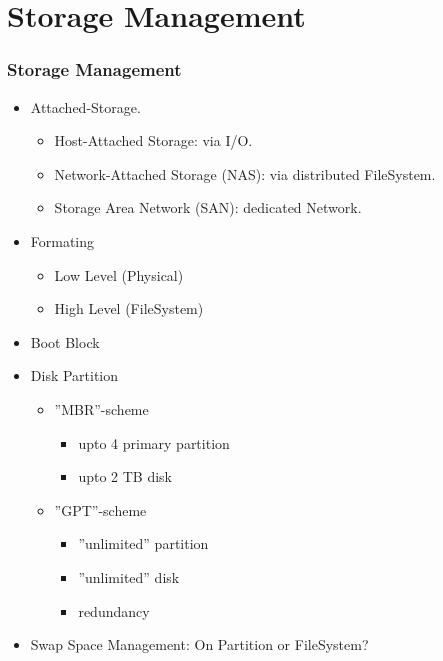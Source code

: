 \documentclass[xcolor=table, notheorems, hyperref={pdfpagelabels=false}]{beamer}
\begin{document}
\section{Storage Management}
\begin{frame}
\frametitle{Storage Management}
\begin{itemize}
\item Attached-Storage.
\begin{itemize}
\item Host-Attached Storage: via I/O.
\item Network-Attached Storage (NAS): via distributed FileSystem.
\item Storage Area Network (SAN): dedicated Network.
\end{itemize}
\item Formating
\begin{itemize}
\item Low Level (Physical)
\item High Level (FileSystem)
\end{itemize}
\item Boot Block
\item Disk Partition
\begin{itemize}
\item ''MBR''-scheme
\begin{itemize}
\item upto 4 primary partition
\item upto 2 TB disk
\end{itemize}
\item ''GPT''-scheme
\begin{itemize}
\item ''unlimited'' partition
\item ''unlimited'' disk
\item redundancy
\end{itemize}
\end{itemize}
\item Swap Space Management: On Partition or FileSystem?
\end{itemize}
\end{frame}

\end{document}
